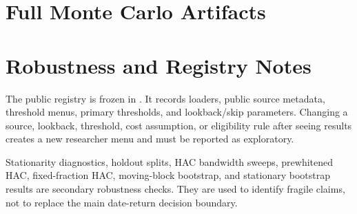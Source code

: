 \documentclass[12pt,a4paper]{article}
\begin{document}


\section{Full Monte Carlo Artifacts}



\section{Robustness and Registry Notes}

The public registry is frozen in .  It
records loaders, public source metadata, threshold menus, primary
thresholds, and lookback/skip parameters.  Changing a source, lookback,
threshold, cost assumption, or eligibility rule after seeing results
creates a new researcher menu and must be reported as exploratory.

Stationarity diagnostics, holdout splits, HAC bandwidth sweeps,
prewhitened HAC, fixed-fraction HAC, moving-block bootstrap, and
stationary bootstrap results are secondary robustness checks.  They are
used to identify fragile claims, not to replace the main date-return
decision boundary.
\end{document}

